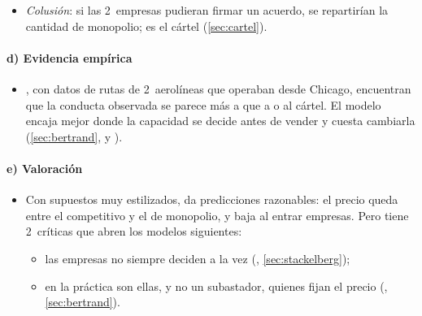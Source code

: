 \documentclass[11pt]{article}
\begin{document}
\begin{itemize}
  \begin{itemize}
  \item \emph{Implicaciones}: comparada con la información completa, la empresa informada de coste alto produce \emph{más} y gana más, y la de coste bajo produce \emph{menos} y gana menos, porque la rival responde a la media. A la de coste bajo le gustaría demostrar que lo es: es el origen de la señalización . Desarrollo y ejemplo en el anexo~\ref{anexo:cournot-bayesiano}.
  \end{itemize}
\item \emph{Colusión}: si las 2~empresas pudieran firmar un acuerdo, se repartirían la cantidad de monopolio; es el cártel (\ref{sec:cartel}).
\end{itemize}

\paragraph{d) Evidencia empírica}

\begin{itemize}
\item \textcite{BranderZhang1990Market}, con datos de rutas de 2~aerolíneas que operaban desde Chicago, encuentran que la conducta observada se parece más a  que a  o al cártel. El modelo encaja mejor donde la capacidad se decide antes de vender y cuesta cambiarla (\ref{sec:bertrand},  y ).
\end{itemize}

\paragraph{e) Valoración}

\begin{itemize}
\item Con supuestos muy estilizados,  da predicciones razonables: el precio queda entre el competitivo y el de monopolio, y baja al entrar empresas. Pero tiene 2~críticas que abren los modelos siguientes:
  \begin{itemize}
  \item las empresas no siempre deciden a la vez (, \ref{sec:stackelberg});
  \item en la práctica son ellas, y no un subastador, quienes fijan el precio (, \ref{sec:bertrand}).
  \end{itemize}
\end{itemize}
\end{document}
